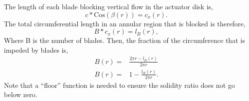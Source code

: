 







%
%



The length of each blade blocking vertical flow in the actuator disk is, 
\begin{equation}
  c * \text{Cos}(\beta(r)) = c_x(r). 
\end{equation}
The total circumferential length in an annular region that is blocked
is therefore, 
\begin{equation}
  B * c_x(r) = l_B(r),
\end{equation}
Where B is the number of blades. 
Then, the fraction of the circumference that is impeded by blades is, 
\begin{eqnarray}
 B(r) =& \frac{2\pi r- l_B(r)}{2 \pi r}\\
 B(r) =& 1- \frac{l_B(r)}{2 \pi r}. 
\end{eqnarray}
Note that a ``floor'' function is needed to ensure the solidity ratio
does not go below zero. 

